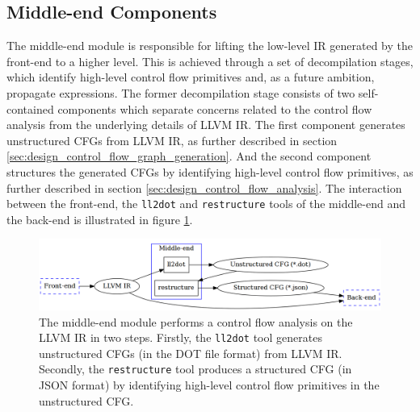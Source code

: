 


\subsection{Middle-end Components}
\label{sec:middle-end_components}

The middle-end module is responsible for lifting the low-level IR generated by the front-end to a higher level. This is achieved through a set of decompilation stages, which identify high-level control flow primitives and, as a future ambition, propagate expressions. The former decompilation stage consists of two self-contained components which separate concerns related to the control flow analysis from the underlying details of LLVM IR. The first component generates unstructured CFGs from LLVM IR, as further described in section \ref{sec:design_control_flow_graph_generation}. And the second component structures the generated CFGs by identifying high-level control flow primitives, as further described in section \ref{sec:design_control_flow_analysis}. The interaction between the front-end, the \texttt{ll2dot} and \texttt{restructure} tools of the middle-end and the back-end is illustrated in figure \ref{fig:middle-end}.

\begin{figure}[htbp]
	\begin{center}
		\includegraphics[width=\textwidth]{inc/middle-end.png}
		\caption{The middle-end module performs a control flow analysis on the LLVM IR in two steps. Firstly, the \texttt{ll2dot} tool generates unstructured CFGs (in the DOT file format) from LLVM IR. Secondly, the \texttt{restructure} tool produces a structured CFG (in JSON format) by identifying high-level control flow primitives in the unstructured CFG.}
		\label{fig:middle-end}
	\end{center}
\end{figure}




